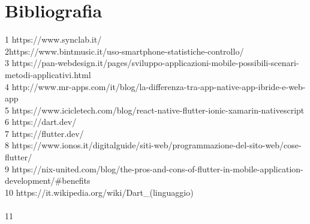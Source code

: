 

\cleardoublepage
\chapter{Bibliografia}

\nocite{*}
\printbibliography[heading=subbibliography,title={Riferimenti bibliografici},type=book]

\printbibliography[heading=subbibliography,title={Siti web consultati},type=online]

1 https://www.synclab.it/
\\
2https://www.bintmusic.it/uso-smartphone-statistiche-controllo/
\\
3 https://pan-webdesign.it/pages/sviluppo-applicazioni-mobile-possibili-scenari-metodi-applicativi.html
\\
4 http://www.mr-apps.com/it/blog/la-differenza-tra-app-native-app-ibride-e-web-app
\\
5 https://www.icicletech.com/blog/react-native-flutter-ionic-xamarin-nativescript
\\
6 https://dart.dev/
\\
7 https://flutter.dev/
\\
8 https://www.ionos.it/digitalguide/siti-web/programmazione-del-sito-web/cose-flutter/
\\
9 https://nix-united.com/blog/the-pros-and-cons-of-flutter-in-mobile-application-development/\#benefits
\\
10 https://it.wikipedia.org/wiki/Dart\_(linguaggio)\\
\\
11 








